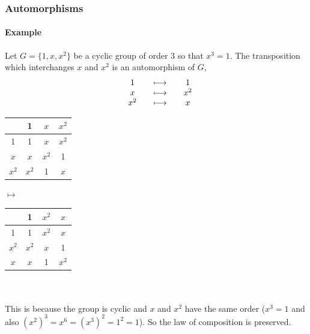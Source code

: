 \documentclass[MathsNotesBase.tex]{subfiles}
\begin{document}
{	\bigskip
	\subsubsection{Automorphisms}
	\paragraph{Example}
	Let $G = \{1, x, x^2\}$ be a cyclic group of order 3 so that $x^3 = 1$. The transposition which interchanges $x$ and $x^2$ is an automorphism of $G$,
	\[\begin{array}{*6c}
		&1 &&\longmapsto &&1 \\
		&x &&\longmapsto &&x^2 \\
		&x^2 &&\longmapsto &&x \\
	\end{array}\]
	\begin{table}[h!]%
		\centering%
		\begin{tabular}{|c||c|c|c|}
			\hline
      &  1    & $x$   & $x^2$ \\
			\hline
			\hline
		 1    &  1    & $x$   & $x^2$ \\
			\hline
			$x$   & $x$   & $x^2$ & 1     \\
			\hline
			$x^2$ & $x^2$ & 1     & $x$ \\
			\hline
		\end{tabular}
		$ \longmapsto $
		\begin{tabular}{|c||c|c|c|}
			\hline
      &  1    & $x^2$ & $x$  \\
			\hline
			\hline
			1     &  1    & $x^2$  & $x$  \\
			\hline
			$x^2$ & $x^2$ & $x$   & 1    \\
			\hline
			$x$   & $x$   & 1     & $x^2$ \\
			\hline
		\end{tabular}
	\end{table}
	\\\\This is because the group is cyclic and $x$ and $x^2$ have the same order ($x^3 = 1$ and also $(x^2)^3 = x^6 = (x^3)^2 = 1^2 = 1$). So the law of composition is preserved.
	
	\bigskip
}
\end{document}
